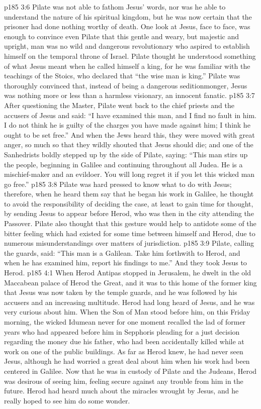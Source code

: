 \vs p185 3:6 Pilate was not able to fathom Jesus’ words, nor was he able to understand the nature of his spiritual kingdom, but he was now certain that the prisoner had done nothing worthy of death. One look at Jesus, face to face, was enough to convince even Pilate that this gentle and weary, but majestic and upright, man was no wild and dangerous revolutionary who aspired to establish himself on the temporal throne of Israel. Pilate thought he understood something of what Jesus meant when he called himself a king, for he was familiar with the teachings of the Stoics, who declared that “the wise man is king.” Pilate was thoroughly convinced that, instead of being a dangerous seditionmonger, Jesus was nothing more or less than a harmless visionary, an innocent fanatic.
\vs p185 3:7 After questioning the Master, Pilate went back to the chief priests and the accusers of Jesus and said: “I have examined this man, and I find no fault in him. I do not think he is guilty of the charges you have made against him; I think he ought to be set free.” And when the Jews heard this, they were moved with great anger, so much so that they wildly shouted that Jesus should die; and one of the Sanhedrists boldly stepped up by the side of Pilate, saying: “This man stirs up the people, beginning in Galilee and continuing throughout all Judea. He is a mischief\hyp{}maker and an evildoer. You will long regret it if you let this wicked man go free.”
\vs p185 3:8 Pilate was hard pressed to know what to do with Jesus; therefore, when he heard them say that he began his work in Galilee, he thought to avoid the responsibility of deciding the case, at least to gain time for thought, by sending Jesus to appear before Herod, who was then in the city attending the Passover. Pilate also thought that this gesture would help to antidote some of the bitter feeling which had existed for some time between himself and Herod, due to numerous misunderstandings over matters of jurisdiction.
\vs p185 3:9 Pilate, calling the guards, said: “This man is a Galilean. Take him forthwith to Herod, and when he has examined him, report his findings to me.” And they took Jesus to Herod.
\vs p185 4:1 When Herod Antipas stopped in Jerusalem, he dwelt in the old Maccabean palace of Herod the Great, and it was to this home of the former king that Jesus was now taken by the temple guards, and he was followed by his accusers and an increasing multitude. Herod had long heard of Jesus, and he was very curious about him. When the Son of Man stood before him, on this Friday morning, the wicked Idumean never for one moment recalled the lad of former years who had appeared before him in Sepphoris pleading for a just decision regarding the money due his father, who had been accidentally killed while at work on one of the public buildings. As far as Herod knew, he had never seen Jesus, although he had worried a great deal about him when his work had been centered in Galilee. Now that he was in custody of Pilate and the Judeans, Herod was desirous of seeing him, feeling secure against any trouble from him in the future. Herod had heard much about the miracles wrought by Jesus, and he really hoped to see him do some wonder.
